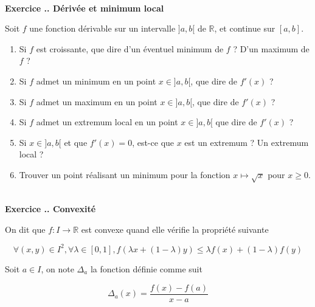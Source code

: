 \documentclass{article}
\newcommand{\mb}[1]{\mathbb{#1}}
\newcounter{exo}
\newcommand{\exercice}[1][\null]{\textbf{\\ \large Exercice \thesection.\theexo. \normalsize #1} \addtocounter{exo}{1}}
\begin{document}
\exercice[Dérivée et minimum local]

Soit $f$ une fonction dérivable sur un intervalle $]a,b[$ de $\mb{R}$,
et continue sur $[a,b]$.

\begin{enumerate}
    \item Si $f$ est croissante, que dire d'un éventuel minimum de $f$ ? 
        D'un maximum de $f$ ?
    \item Si $f$ admet un minimum en un point $x \in ]a,b[$, 
        que dire de $f'(x)$ ?
    \item Si $f$ admet un maximum en un point $x \in ]a,b[$,
        que dire de $f'(x)$ ?
    \item Si $f$ admet un extremum local en un point $x \in ]a,b[$
        que dire de $f'(x)$ ?
    \item Si $x \in ]a,b[$ et que $f'(x) = 0$, est-ce que $x$
        est un extremum ? Un extremum local ?
    \item Trouver un point réalisant un
        minimum pour la fonction $x \mapsto \sqrt{x}$ pour $x \geq 0$.
\end{enumerate}

\exercice[Convexité]

On dit que $f : I \to \mb{R}$ est convexe quand elle vérifie 
la propriété suivante

\begin{equation*}
    \forall (x,y) \in I^2, \forall \lambda \in [0,1], 
    f(\lambda x + (1-\lambda)y) \leq \lambda f(x) + (1-\lambda) f(y)
\end{equation*}

Soit $a \in I$, on note $\Delta_a$ la fonction définie comme suit

\begin{equation*}
    \Delta_a (x) = \frac{f(x) - f(a)}{x - a}
\end{equation*}
\end{document}
